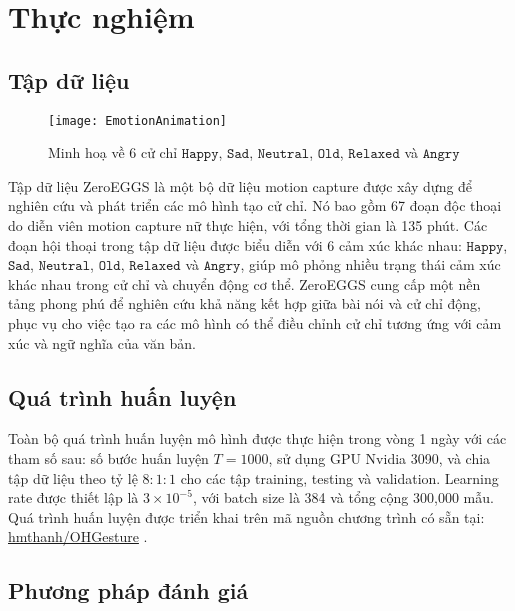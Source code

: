 \chapter{Thực nghiệm}
\label{Chapter4}

\section{Tập dữ liệu}

\setcounter{figure}{12}
\begin{figure}
	\centering
	\texttt{[image: EmotionAnimation]}
	\caption{Minh hoạ về 6 cử chỉ $\texttt{Happy}$, $\texttt{Sad}$, $\texttt{Neutral}$, $\texttt{Old}$, $\texttt{Relaxed}$ và $\texttt{Angry}$}
\end{figure}

Tập dữ liệu ZeroEGGS \cite{ghorbani2023zeroeggs} là một bộ dữ liệu motion capture được xây dựng để nghiên cứu và phát triển các mô hình tạo cử chỉ. Nó bao gồm 67 đoạn độc thoại do diễn viên motion capture nữ thực hiện, với tổng thời gian là 135 phút. Các đoạn hội thoại trong tập dữ liệu được biểu diễn với 6 cảm xúc khác nhau: $\texttt{Happy}$, $\texttt{Sad}$, $\texttt{Neutral}$, $\texttt{Old}$, $\texttt{Relaxed}$ và $\texttt{Angry}$, giúp mô phỏng nhiều trạng thái cảm xúc khác nhau trong cử chỉ và chuyển động cơ thể. ZeroEGGS cung cấp một nền tảng phong phú để nghiên cứu khả năng kết hợp giữa bài nói và cử chỉ động, phục vụ cho việc tạo ra các mô hình có thể điều chỉnh cử chỉ tương ứng với cảm xúc và ngữ nghĩa của văn bản.


\section{Quá trình huấn luyện}

Toàn bộ quá trình huấn luyện mô hình được thực hiện trong vòng 1 ngày với các tham số sau: số bước huấn luyện $T = 1000$, sử dụng GPU Nvidia 3090, và chia tập dữ liệu theo tỷ lệ $8:1:1$ cho các tập training, testing và validation. Learning rate được thiết lập là $3 \times 10^{-5}$, với batch size là 384 và tổng cộng 300,000 mẫu. Quá trình huấn luyện được triển khai trên mã nguồn chương trình có sẵn tại: \hyperlink{https://github.com/hmthanh/OHGesture}{hmthanh/OHGesture} .

\section{Phương pháp đánh giá}
\label{sec:evaluation}

